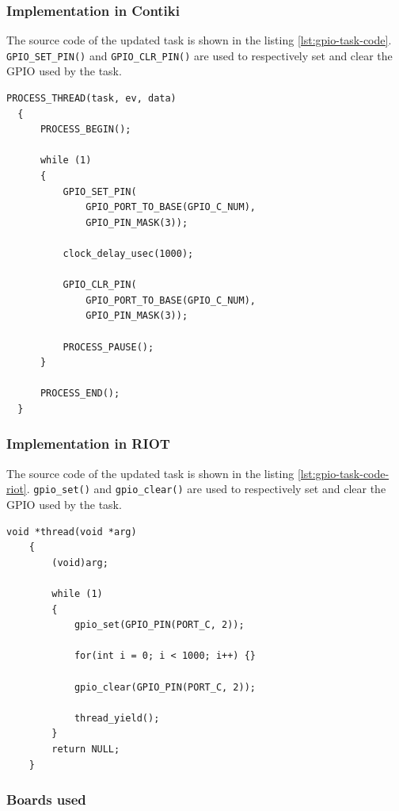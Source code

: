 \subsubsection{Implementation in Contiki}
The source code of the updated task is shown in the listing \ref{lst:gpio-task-code}.
\texttt{GPIO\_SET\_PIN()} and \texttt{GPIO\_CLR\_PIN()} are used to respectively set and clear the GPIO used by the task.

\begin{lstlisting}[style=CStyle, float, label={lst:gpio-task-code}, caption={source code of the task with GPIO calls}]
  PROCESS_THREAD(task, ev, data)
  {
      PROCESS_BEGIN();
  
      while (1)
      {
          GPIO_SET_PIN(
              GPIO_PORT_TO_BASE(GPIO_C_NUM), 
              GPIO_PIN_MASK(3));

          clock_delay_usec(1000);

          GPIO_CLR_PIN(
              GPIO_PORT_TO_BASE(GPIO_C_NUM), 
              GPIO_PIN_MASK(3));

          PROCESS_PAUSE();
      }
  
      PROCESS_END();
  }
\end{lstlisting}

\subsubsection{Implementation in RIOT}
The source code of the updated task is shown in the listing \ref{lst:gpio-task-code-riot}.
\texttt{gpio\_set()} and \texttt{gpio\_clear()} are used to respectively set and clear the GPIO used by the task.

\begin{lstlisting}[style=CStyle, float, label={lst:gpio-task-code-riot}, caption={source code of a task implemented in RIOT for the simple application}]
    void *thread(void *arg)
    {
        (void)arg;
    
        while (1)
        {
            gpio_set(GPIO_PIN(PORT_C, 2));

            for(int i = 0; i < 1000; i++) {}

            gpio_clear(GPIO_PIN(PORT_C, 2));

            thread_yield();
        }
        return NULL;
    }
\end{lstlisting}

\subsubsection{Boards used}

